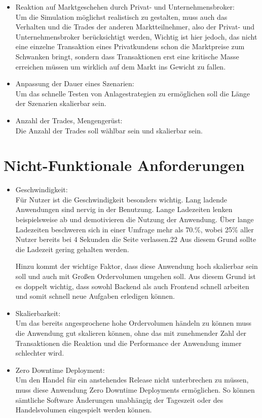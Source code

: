 \begin{itemize}
		\item Reaktion auf Marktgeschehen durch Privat- und Unternehmensbroker: \\
			Um die Simulation möglichst realistisch zu gestalten, muss auch das Verhalten und die Trades der anderen Marktteilnehmer, also der Privat- und Unternehmensbroker berücksichtigt werden, Wichtig ist hier jedoch, das nicht eine einzelne Transaktion eines Privatkundens schon die Marktpreise zum Schwanken bringt, sondern dass Transaktionen erst eine kritische Masse erreichen müssen um wirklich auf dem Markt ins Gewicht zu fallen. 
			
		\item Anpassung der Dauer eines Szenarien: \\
			Um das schnelle Testen von Anlagestrategien zu ermöglichen soll die Länge der Szenarien skalierbar sein. 
			
		\item Anzahl der Trades, Mengengerüst: \\
			Die Anzahl der Trades soll wählbar sein und skalierbar sein. 
	\end{itemize}
\section{Nicht-Funktionale Anforderungen}
		\begin{itemize}
		\item Geschwindigkeit: \\
			Für Nutzer ist die Geschwindigkeit besonders wichtig. Lang ladende Anwendungen
			sind nervig in der Benutzung. Lange Ladezeiten lenken beispielsweise
			ab und demotivieren die Nutzung der Anwendung. Über lange Ladezeiten
			beschweren sich in einer Umfrage mehr als 70.\%, wobei 25\% aller Nutzer bereits bei 4
			Sekunden die Seite verlassen.22 Aus diesem Grund sollte die Ladezeit gering gehalten
			werden. %
			
			Hinzu kommt der wichtige Faktor, dass diese Anwendung hoch skalierbar sein soll und auch mit Großen Ordervolumen umgehen soll. Aus diesem Grund ist es doppelt wichtig, dass sowohl Backend als auch Frontend schnell arbeiten und somit schnell neue Aufgaben erledigen können.
			
		\item Skalierbarkeit: \\
			Um das bereits angesprochene hohe Ordervolumen händeln zu können muss die Anwendung gut skalieren können, ohne das mit zunehmender Zahl der Transaktionen die Reaktion und die Performance der Anwendung immer schlechter wird. 
			
		\item Zero Downtime Deployment: \\
			Um den Handel für ein anstehendes Release nicht unterbrechen zu müssen, muss diese Anwendung Zero Downtime Deployments ermöglichen. So können sämtliche Software Änderungen unabhängig der Tageszeit oder des Handelsvolumen eingespielt werden können. 
	\end{itemize}
